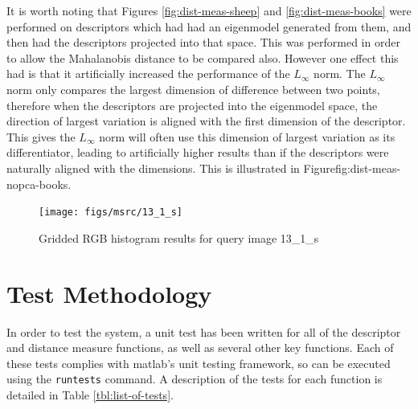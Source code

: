 \begin{appendices}
It is worth noting that Figures \ref{fig:dist-meas-sheep} and \ref{fig:dist-meas-books} were performed on descriptors which had had an eigenmodel generated from them, and then had the descriptors projected into that space. This was performed in order to allow the Mahalanobis distance to be compared also. However one effect this had is that it artificially increased the performance of the $L_\infty$ norm. The $L_\infty$ norm only compares the largest dimension of difference between two points, therefore when the descriptors are projected into the eigenmodel space, the direction of largest variation is aligned with the first dimension of the descriptor. This gives the $L_\infty$ norm will often use this dimension of largest variation as its differentiator, leading to artificially higher results than if the descriptors were naturally aligned with the dimensions. This is illustrated in Figure{fig:dist-meas-nopca-books}.


\begin{figure}[ht]
	\begin{minipage}[]{0.3\linewidth}
		\centering
		\texttt{[image: figs/msrc/13\_1\_s]}
	\end{minipage}
	\begin{minipage}[]{0.7\linewidth}
		\centering
	\end{minipage}
	\caption{Gridded RGB histogram results for query image 13\_1\_s}
	\label{fig:dist-meas-nopca-books}
\end{figure}


\chapter{Test Methodology} \label{app:test-methodology}
In order to test the system, a unit test has been written for all of the descriptor and distance measure functions, as well as several other key functions. Each of these tests complies with \gls{matlab}'s unit testing framework, so can be executed using the \texttt{runtests} command. A description of the tests for each function is detailed in Table \ref{tbl:list-of-tests}.


\end{appendices}
